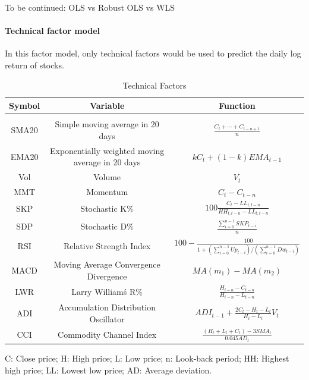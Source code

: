 \documentclass[]{article}
\let\oldparagraph\paragraph
\renewcommand{\paragraph}[1]{\oldparagraph{#1}\mbox{}}
\begin{document}
To be continued: OLS vs Robust OLS vs WLS

\hypertarget{technical-factor-model}{%
\paragraph{Technical factor model}\label{technical-factor-model}}

In this factor model, only technical factors would be used to predict
the daily log return of stocks.

\begin{table}[H]
\begin{threeparttable}  
\begin{center}
\caption{Technical Factors}
\label{table2}
\centering
\begin{tabular}{c c c}\hline 
Symbol & Variable & Function\\ \hline 
\\
SMA20 & Simple moving average in 20 days & \(\displaystyle \frac{C_t+\cdots+C_{t-n+1}}{n}\)\\[12pt]
EMA20 & Exponentially weighted moving average in 20 days & $kC_t+(1-k)EMA_{t-1}$\\[12pt]
Vol & Volume & $V_t$\\[12pt]
MMT & Momentum & $C_t-C_{t-n}$\\[12pt]
SKP & Stochastic K\% & \(\displaystyle 100\frac{C_t-LL_{t,t-n}}{HH_{t,t-n}-LL_{t,t-n}}\)\\[12pt]
SDP & Stochastic D\% & \(\displaystyle \frac{\sum_{i=0}^{n-1} SKP_{t-i}}{n}\)\\[12pt]
RSI & Relative Strength Index & \(\displaystyle 100-\frac{100}{1+(\sum_{i=0}^{n-1} Up_{t-i})/(\sum_{i=0}^{n-1} Dw_{t-i})}\)\\[18pt]
MACD & Moving Average Convergence Divergence & $MA(m_1)-MA(m_2)$\\[12pt]
LWR & Larry William\'s R\% & \(\displaystyle \frac{H_{t-n}-C_{t-n}}{H_{t-n}-L_{t-n}}\)\\[14pt]
ADI & Accumulation Distribution Oscillator & \(\displaystyle ADI_{t-1}+\frac{2C_t-H_t-L_t}{H_t-L_t}V_t\)\\[12pt]
CCI & Commodity Channel Index & \(\displaystyle \frac{(H_t+L_t+C_t)-3SMA_t}{0.045AD_t}\)\\[12pt]
\hline
\end{tabular}
\begin{tablenotes}
\small
\item C: Close price; H: High price; L: Low price; n: Look-back period; HH: Highest high price; LL: Lowest low price; AD: Average deviation.
\end{tablenotes}
\end{center}
\end{threeparttable}
\end{table}
\end{document}
